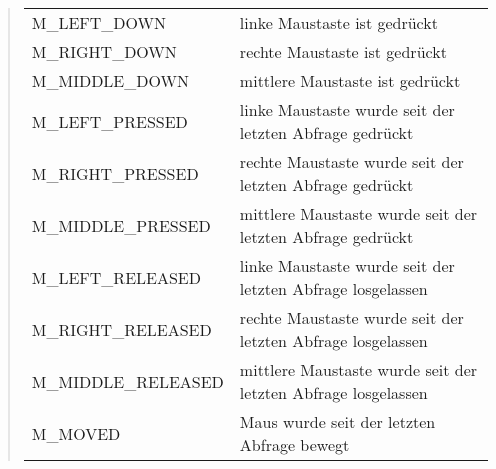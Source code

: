\begin{quote}
\begin{tabular}{ll}
M\_LEFT\_DOWN&\begin{minipage}[t]{9cm}linke Maustaste ist gedrückt\end{minipage}\\
M\_RIGHT\_DOWN&\begin{minipage}[t]{9cm}rechte Maustaste ist gedrückt\end{minipage}\\
M\_MIDDLE\_DOWN&\begin{minipage}[t]{9cm}mittlere Maustaste ist gedrückt\end{minipage}\\
M\_LEFT\_PRESSED&\begin{minipage}[t]{9cm}linke Maustaste wurde seit der letzten
Abfrage gedrückt\end{minipage}\\
M\_RIGHT\_PRESSED&\begin{minipage}[t]{9cm}rechte Maustaste wurde seit der letzten
Abfrage gedrückt\end{minipage}\\
M\_MIDDLE\_PRESSED&\begin{minipage}[t]{9cm}mittlere Maustaste wurde seit der
letzten Abfrage gedrückt\end{minipage}\\
M\_LEFT\_RELEASED&\begin{minipage}[t]{9cm}linke Maustaste wurde seit der letzten
Abfrage losgelassen\end{minipage}\\
M\_RIGHT\_RELEASED&\begin{minipage}[t]{9cm}rechte Maustaste wurde seit der letzten
Abfrage losgelassen\end{minipage}\\
M\_MIDDLE\_RELEASED&\begin{minipage}[t]{9cm}mittlere Maustaste wurde seit der
letzten Abfrage losgelassen\end{minipage}\\
M\_MOVED&\begin{minipage}[t]{9cm}Maus wurde seit der letzten Abfrage bewegt\end{minipage}\\
\end{tabular}
\end{quote}

